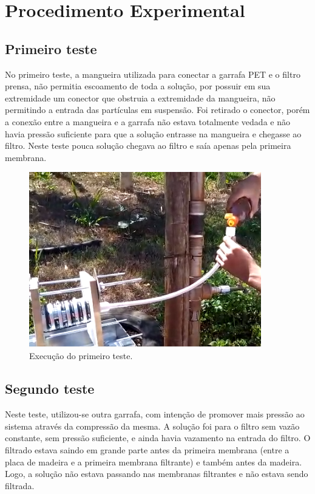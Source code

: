 \chapter{Procedimento Experimental}\label{procedimento}

\section{Primeiro teste}\label{sec:primeiro_teste}

No primeiro teste, a mangueira utilizada para conectar a garrafa PET e o filtro
prensa, não permitia escoamento de toda a solução, por possuir em sua
extremidade um conector que obstruia a extremidade da mangueira, não permitindo
a entrada das partículas em suspensão. Foi retirado o conector, porém a conexão
entre a mangueira e a garrafa não estava totalmente vedada e não havia pressão
suficiente para que a solução entrasse na mangueira e chegasse ao filtro. Neste
teste pouca solução chegava ao filtro e saía apenas pela primeira membrana.

\begin{figure}[H]
  \centering
  \includegraphics[width=0.9\textwidth]{figuras/primeiro_teste.png}
  \caption{Execução do primeiro teste.\label{fig:primeiro_teste}}
\end{figure}


\section{Segundo teste}\label{sec:segundo_teste}

Neste teste, utilizou-se outra garrafa, com intenção de promover mais pressão ao
sistema através da compressão da mesma. A solução foi para o filtro sem vazão
constante, sem pressão suficiente, e ainda havia vazamento na entrada do filtro.
O filtrado estava saindo em grande parte antes da primeira membrana (entre a
placa de madeira e a primeira membrana filtrante) e também antes da madeira.
Logo, a solução não estava passando nas membranas filtrantes e não estava sendo
filtrada.

